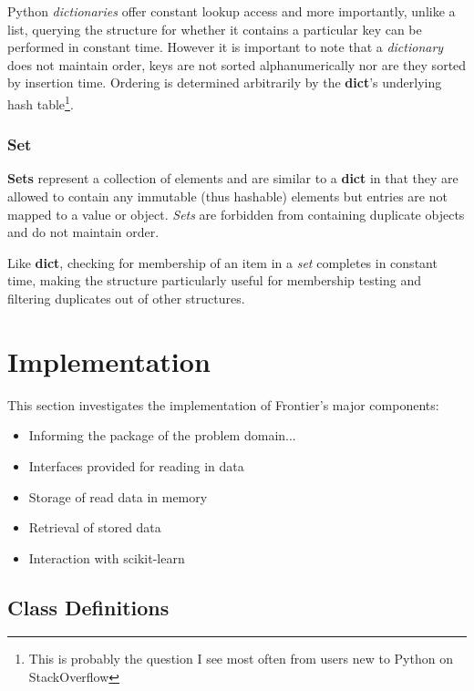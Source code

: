 Python \textit{dictionaries} offer constant lookup access and more importantly,
unlike a list, querying the structure for whether it contains a particular key
can be performed in constant time\citep{py:timecomplexity}.
However it is important to note that a \textit{dictionary} does not maintain
order, keys are not sorted alphanumerically nor are they sorted by insertion
time. Ordering is determined arbitrarily by the \textbf{dict}'s underlying hash
table\footnote{This is probably the question I see most often from users new to
Python on StackOverflow}.


\subsubsection{Set}

\textbf{Sets}\citep{py-set} represent a collection of elements and are similar
to a \textbf{dict} in that they are allowed to contain any immutable (thus
hashable) elements but entries are not mapped to a value or object.
\textit{Sets} are forbidden from containing duplicate objects and do not
maintain order.

Like \textbf{dict}, checking for membership of an item in a \textit{set}
completes in constant time, making the structure particularly useful for
membership testing and filtering duplicates out of other structures.


\section{Implementation}

This section investigates the implementation of Frontier's major components:

\begin{itemize}
    \item Informing the package of the problem domain...
    \item Interfaces provided for reading in data
    \item Storage of read data in memory
    \item Retrieval of stored data
    \item Interaction with scikit-learn
\end{itemize}


\subsection{Class Definitions}
\label{chap:classes}

